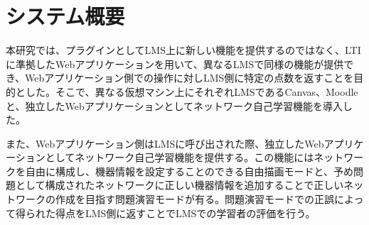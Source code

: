 \section{システム概要}
\label{tag:function}
本研究では、プラグインとしてLMS上に新しい機能を提供するのではなく、LTIに準拠したWebアプリケーションを用いて、異なるLMSで同様の機能が提供でき、Webアプリケーション側での操作に対しLMS側に特定の点数を返すことを目的とした。そこで、異なる仮想マシン上にそれぞれLMSであるCanvas、Moodleと、独立したWebアプリケーションとしてネットワーク自己学習機能を導入した。





また、Webアプリケーション側はLMSに呼び出された際、独立したWebアプリケーションとしてネットワーク自己学習機能を提供する。この機能にはネットワークを自由に構成し、機器情報を設定することのできる自由描画モードと、予め問題として構成されたネットワークに正しい機器情報を追加することで正しいネットワークの作成を目指す問題演習モードが有る。問題演習モードでの正誤によって得られた得点をLMS側に返すことでLMSでの学習者の評価を行う。\\
